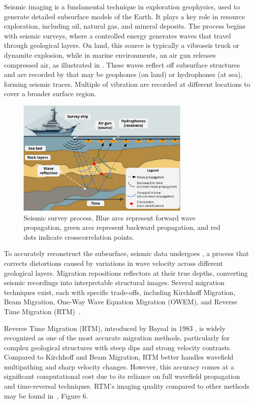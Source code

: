 \documentclass[Ingles]{ic-tese-v3}
\begin{document}
Seismic imaging is a fundamental technique in exploration geophysics, used to generate detailed subsurface models of the Earth. It plays a key role in resource exploration, including oil, natural gas, and mineral deposits. The process begins with seismic surveys, where a controlled energy  generates waves that travel through geological layers. On land, this source is typically a vibroseis truck or dynamite explosion, while in marine environments, an air gun releases compressed air, as illustrated in . These waves reflect off subsurface structures and are recorded by  that may be geophones (on land) or hydrophones (at sea), forming seismic traces\cite{haldar2018}. Multiple  of vibration are recorded at different locations to cover a broader surface region.  


\begin{figure}[h]
    \centering
    \includegraphics[width=0.75\textwidth]{figures/rtm.pdf}
    \caption[Seismic survey]{Seismic survey process. Blue arcs represent forward wave propagation, green arcs represent backward propagation, and red dots indicate crosscorrelation points.}
    \label{fig:rtm}
\end{figure}

To accurately reconstruct the subsurface, seismic data undergoes , a process that corrects distortions caused by variations in wave velocity across different geological layers. Migration repositions reflectors at their true depths, converting seismic recordings into interpretable structural images. Several migration techniques exist, each with specific trade-offs, including Kirchhoff Migration, Beam Migration, One-Way Wave Equation Migration (OWEM), and Reverse Time Migration (RTM)~\cite{etgen2009}.

Reverse Time Migration (RTM), introduced by Baysal \etal in 1983 \cite{rtm}, is widely recognized as one of the most accurate migration methods, particularly for complex geological structures with steep dips and strong velocity contrasts. Compared to Kirchhoff and Beam Migration, RTM better handles wavefield multipathing and sharp velocity changes. However, this accuracy comes at a significant computational cost due to its reliance on full wavefield propagation and time-reversal techniques. RTM's imaging quality compared to other methods may be found in~\cite{etgen2009}, Figure 6.
\end{document}
